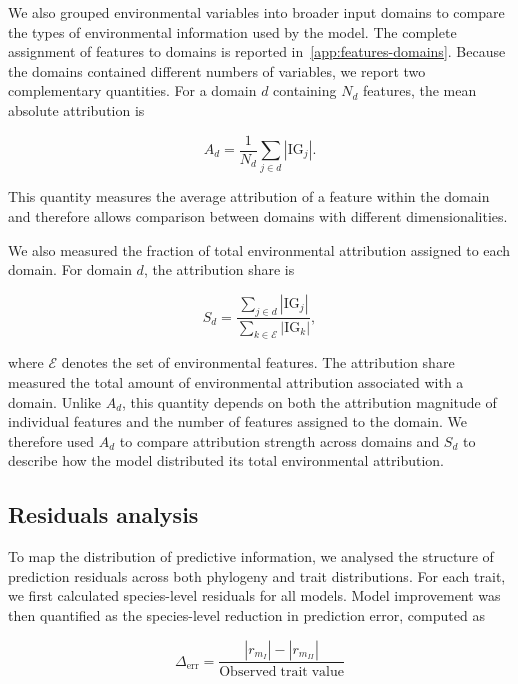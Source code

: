 \documentclass[preprint,12pt,authoryear]{elsarticle}
\begin{document}
We also grouped environmental variables into broader input domains to compare the types of environmental information used by the model. The complete assignment of features to domains is reported in~\ref{app:features-domains}. Because the domains contained different numbers of variables, we report two complementary quantities. For a domain $d$ containing $N_d$ features, the mean absolute attribution is

\begin{equation}
    A_d =
    \frac{1}{N_d}
    \sum_{j \in d} \left|\mathrm{IG}_j\right|.
\end{equation}

This quantity measures the average attribution of a feature within the domain and therefore allows comparison between domains with different dimensionalities.

We also measured the fraction of total environmental attribution assigned to each domain. For domain $d$, the attribution share is

\begin{equation}
    S_d =
    \frac{
        \sum_{j \in d} \left|\mathrm{IG}_j\right|
    }{
        \sum_{k \in \mathcal{E}} \left|\mathrm{IG}_k\right|
    },
\end{equation}

where $\mathcal{E}$ denotes the set of environmental features. The attribution share measured the total amount of environmental attribution associated with a domain. Unlike $A_d$, this quantity depends on both the attribution magnitude of individual features and the number of features assigned to the domain. We therefore used $A_d$ to compare attribution strength across domains and $S_d$ to describe how the model distributed its total environmental attribution.

\subsection{Residuals analysis}

To map the distribution of predictive information, we analysed the structure of prediction residuals across both phylogeny and trait distributions. For each trait, we first calculated species-level residuals for all models. Model improvement was then quantified as the species-level reduction in prediction error, computed as

\begin{equation}
    \Delta_\mathrm{err} = \frac{|r_{m_I}| - |r_{m_{II}}|}{\mathrm{Observed\; trait\; value}}
\end{equation}
\end{document}
